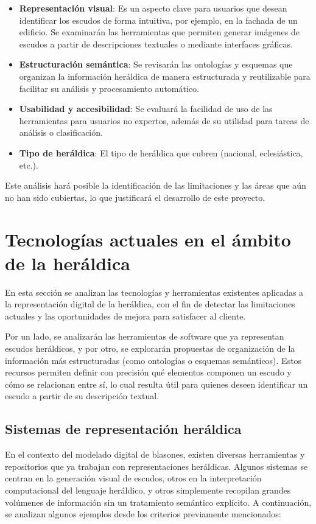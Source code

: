 \begin{itemize}
    \item \textbf{Representación visual}: Es un aspecto clave para usuarios que desean identificar
    los escudos de forma intuitiva, por ejemplo, en la fachada de un edificio. Se examinarán las 
    herramientas que permiten generar imágenes de escudos a partir de descripciones textuales o 
    mediante interfaces gráficas.
    \item \textbf{Estructuración semántica}: Se revisarán las ontologías y esquemas que
    organizan la información heráldica de manera estructurada y reutilizable para facilitar
    su análisis y procesamiento automático.
    \item \textbf{Usabilidad y accesibilidad}: Se evaluará la facilidad de uso de las herramientas
    para usuarios no expertos, además de su utilidad para tareas de análisis o clasificación.
    \item \textbf{Tipo de heráldica}: El tipo de heráldica que cubren (nacional, eclesiástica, etc.).
\end{itemize}

Este análisis hará posible la identificación de las limitaciones y las áreas que aún no han sido
cubiertas, lo que justificará el desarrollo de este proyecto.

\section{Tecnologías actuales en el ámbito de la heráldica}
En esta sección se analizan las tecnologías y herramientas existentes aplicadas a la representación
digital de la heráldica, con el fin de detectar las limitaciones actuales y las oportunidades
de mejora para satisfacer al cliente.

Por un lado, se analizarán las herramientas de software que ya representan escudos heráldicos,
y por otro, se explorarán propuestas de organización de la información más estructuradas
(como ontologías o esquemas semánticos). Estos recursos permiten definir con precisión
qué elementos componen un escudo y cómo se relacionan entre sí, lo cual resulta útil para
quienes deseen identificar un escudo a partir de su descripción textual.

\subsection{Sistemas de representación heráldica}
En el contexto del modelado digital de blasones, existen diversas herramientas y repositorios
que ya trabajan con representaciones heráldicas. Algunos sistemas se centran en la generación 
visual de escudos, otros en la interpretación computacional del lenguaje heráldico, y otros 
simplemente recopilan grandes volúmenes de información sin un tratamiento semántico explícito. 
A continuación, se analizan algunos ejemplos desde los criterios previamente mencionados:

